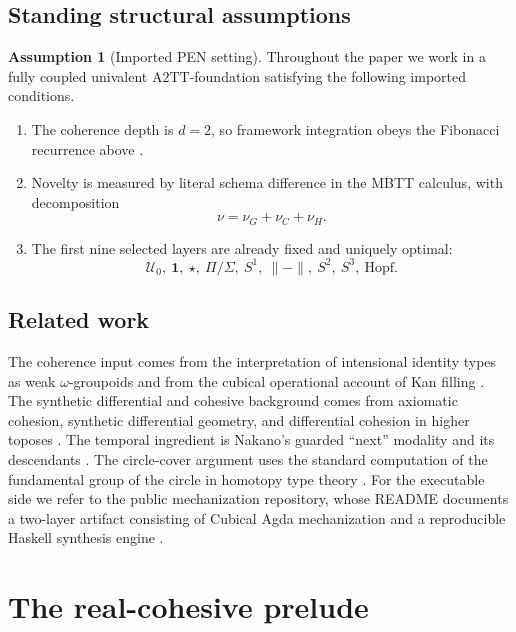 \documentclass[11pt]{article}
\theoremstyle{plain}
\theoremstyle{definition}
\newtheorem{assumption}[theorem]{Assumption}
\theoremstyle{remark}
\newcommand{\U}{\mathcal{U}}
\newcommand{\ATwoTT}{\mathrm{A2TT}}
\begin{document}
\subsection{Standing structural assumptions}

\begin{assumption}[Imported PEN setting]
\label{ass:imported-pen}
Throughout the paper we work in a fully coupled univalent $\ATwoTT$-foundation satisfying the following imported conditions.
\begin{enumerate}
    \item The coherence depth is $d=2$, so framework integration obeys the Fibonacci recurrence above \citep{lande-coherence}.
    \item Novelty is measured by literal schema difference in the MBTT calculus, with decomposition
    \[
      \nu = \nu_G+\nu_C+\nu_H.
    \]
    \item The first nine selected layers are already fixed and uniquely optimal:
    \[
      \U_0,\ \mathbf 1,\ \star,\ \Pi/\Sigma,\ S^1,\ \|{-}\|,\ S^2,\ S^3,\ \mathrm{Hopf}.
    \]
\end{enumerate}
\end{assumption}

\subsection{Related work}

The coherence input comes from the interpretation of intensional identity types as weak $\omega$-groupoids and from the cubical operational account of Kan filling \citep{lumsdaine,vdberg-garner,cubical,cchm-hits}. The synthetic differential and cohesive background comes from axiomatic cohesion, synthetic differential geometry, and differential cohesion in higher toposes \citep{lawvere,kock,schreiber}. The temporal ingredient is Nakano's guarded ``next'' modality and its descendants \citep{nakano}. The circle-cover argument uses the standard computation of the fundamental group of the circle in homotopy type theory \citep{licata-shulman}. For the executable side we refer to the public mechanization repository, whose README documents a two-layer artifact consisting of Cubical Agda mechanization and a reproducible Haskell synthesis engine \citep{lande-repo}.

\section{The real-cohesive prelude}
\end{document}
